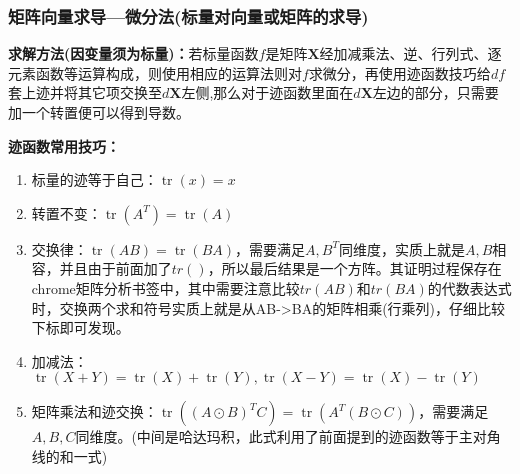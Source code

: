     \subsubsection{矩阵向量求导---微分法(标量对向量或矩阵的求导)}
    \textbf{求解方法(因变量须为标量)：}若标量函数$f$是矩阵$\bm{X}$经加减乘法、逆、行列式、逐元素函数等运算构成，则使用相应的运算法则对$f$求微分，再使用迹函数技巧给$df$套上迹并将其它项交换至$d\bm{X}$左侧,那么对于迹函数里面在$d\bm{X}$左边的部分，只需要加一个转置便可以得到导数。


    \textbf{迹函数常用技巧：}
    \begin{enumerate}
        \item 标量的迹等于自己：$\operatorname{tr}(x)=x$
        \item 转置不变：$\operatorname{tr}\left(A^{T}\right)=\operatorname{tr}(A)$
        \item 交换律：$\operatorname{tr}(A B)=\operatorname{tr}(B A)$，需要满足$A,B^T$同维度，实质上就是$A,B$相容，并且由于前面加了$tr()$，所以最后结果是一个方阵。其证明过程保存在chrome矩阵分析书签中，其中需要注意比较$tr(AB)$和$tr(BA)$的代数表达式时，交换两个求和符号实质上就是从AB->BA的矩阵相乘(行乘列)，仔细比较下标即可发现。
        \item 加减法：$\operatorname{tr}(X+Y)=\operatorname{tr}(X)+\operatorname{tr}(Y), \operatorname{tr}(X-Y)=\operatorname{tr}(X)-\operatorname{tr}(Y)$
        \item 矩阵乘法和迹交换：$\operatorname{tr}\left((A \odot B)^{T} C\right)=\operatorname{tr}\left(A^{T}(B \odot C)\right)$，需要满足$A,B,C$同维度。(中间是哈达玛积，此式利用了前面提到的迹函数等于主对角线的和一式)
    \end{enumerate}




